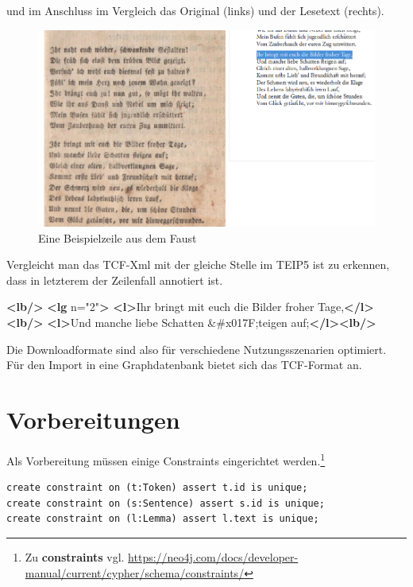 \documentclass[ngerman,]{scrreprt}
\newenvironment{Shaded}{}{}
\newcommand{\KeywordTok}[1]{\textcolor[rgb]{0.00,0.44,0.13}{\textbf{#1}}}
\newcommand{\DecValTok}[1]{\textcolor[rgb]{0.25,0.63,0.44}{#1}}
\newcommand{\StringTok}[1]{\textcolor[rgb]{0.25,0.44,0.63}{#1}}
\newcommand{\OtherTok}[1]{\textcolor[rgb]{0.00,0.44,0.13}{#1}}
\newcommand{\NormalTok}[1]{#1}
\begin{document}
und im Anschluss im Vergleich das Original (links) und der Lesetext (rechts).

\begin{figure}
\centering
\includegraphics{Bilder/Faust-S11-Faks.png}
\caption{Eine Beispielzeile aus dem Faust}
\end{figure}

Vergleicht man das TCF-Xml mit der gleiche Stelle im TEIP5 ist zu erkennen, dass in letzterem der Zeilenfall annotiert ist.

\begin{Shaded}
\begin{Highlighting}[]
\KeywordTok{<lb/>}
  \KeywordTok{<lg}\OtherTok{ n=}\StringTok{"2"}\KeywordTok{>}
      \KeywordTok{<l>}\NormalTok{Ihr bringt mit euch die Bilder froher Tage,}\KeywordTok{</l><lb/>}
      \KeywordTok{<l>}\NormalTok{Und manche liebe Schatten }\DecValTok{&#x017F;}\NormalTok{teigen auf;}\KeywordTok{</l><lb/>}
\end{Highlighting}
\end{Shaded}

Die Downloadformate sind also für verschiedene Nutzungsszenarien optimiert. Für den Import in eine Graphdatenbank bietet sich das TCF-Format an.

\section{Vorbereitungen}\label{vorbereitungen}

Als Vorbereitung müssen einige Constraints eingerichtet werden.\footnote{Zu \textbf{constraints} vgl. \url{https://neo4j.com/docs/developer-manual/current/cypher/schema/constraints/}}

\begin{verbatim}
create constraint on (t:Token) assert t.id is unique;
create constraint on (s:Sentence) assert s.id is unique;
create constraint on (l:Lemma) assert l.text is unique;
\end{verbatim}
\end{document}

